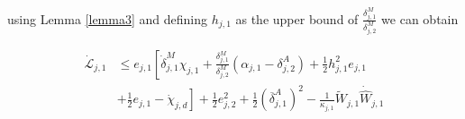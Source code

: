 using Lemma \ref{lemma3} and defining  $h_{j,1}$ as the upper bound of $\frac{\delta_{j,1}^M}{\delta_{j,2}^M}$ we can obtain

\begin{equation}
\label{eq:dL_j1_rewritten}
\begin{aligned}
\dot{\mathcal{L}}_{j,1} &\leq e_{j,1} \left[ \dot{\delta}_{j,1}^M \chi_{j,1} + \frac{\delta_{j,1}^M}{\delta_{j,2}^M}( \alpha_{j,1} - \delta_{j,2}^A) + \frac{1}{2}h_{j,1}^2 e_{j,1} \right. \\
& \left. + \frac{1}{2}e_{j,1} - \dot{\chi}_{j,d} \right] + \frac{1}{2}e_{j,2}^2 + \frac{1}{2} (\overline{\delta}_{j,1}^A)^2 - \frac{1}{\kappa_{j,1}}\tilde{W}_{j,1}\dot{\hat{W}}_{j,1}
\end{aligned}
\end{equation}


